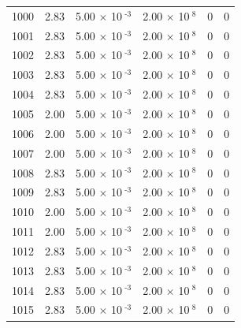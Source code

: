 \documentclass[a4paper,11pt]{article}
\begin{document}
\begin{center}
\begin{longtable}{|R{1.5cm}|R{2.4cm}|R{2.4cm}|R{2.4cm}|R{2.4cm}|R{2.4cm}|}
 1000 &   2.83  &         5.00 $\times$ 10$^{\text{          -3}}$  &         2.00 $\times$ 10$^{\text{           8}}$  & 0  & 0 \\
 1001 &   2.83  &         5.00 $\times$ 10$^{\text{          -3}}$  &         2.00 $\times$ 10$^{\text{           8}}$  & 0  & 0 \\
 1002 &   2.83  &         5.00 $\times$ 10$^{\text{          -3}}$  &         2.00 $\times$ 10$^{\text{           8}}$  & 0  & 0 \\
 1003 &   2.83  &         5.00 $\times$ 10$^{\text{          -3}}$  &         2.00 $\times$ 10$^{\text{           8}}$  & 0  & 0 \\
 1004 &   2.83  &         5.00 $\times$ 10$^{\text{          -3}}$  &         2.00 $\times$ 10$^{\text{           8}}$  & 0  & 0 \\
 1005 &   2.00  &         5.00 $\times$ 10$^{\text{          -3}}$  &         2.00 $\times$ 10$^{\text{           8}}$  & 0  & 0 \\
 1006 &   2.00  &         5.00 $\times$ 10$^{\text{          -3}}$  &         2.00 $\times$ 10$^{\text{           8}}$  & 0  & 0 \\
 1007 &   2.00  &         5.00 $\times$ 10$^{\text{          -3}}$  &         2.00 $\times$ 10$^{\text{           8}}$  & 0  & 0 \\
 1008 &   2.83  &         5.00 $\times$ 10$^{\text{          -3}}$  &         2.00 $\times$ 10$^{\text{           8}}$  & 0  & 0 \\
 1009 &   2.83  &         5.00 $\times$ 10$^{\text{          -3}}$  &         2.00 $\times$ 10$^{\text{           8}}$  & 0  & 0 \\
 1010 &   2.00  &         5.00 $\times$ 10$^{\text{          -3}}$  &         2.00 $\times$ 10$^{\text{           8}}$  & 0  & 0 \\
 1011 &   2.00  &         5.00 $\times$ 10$^{\text{          -3}}$  &         2.00 $\times$ 10$^{\text{           8}}$  & 0  & 0 \\
 1012 &   2.83  &         5.00 $\times$ 10$^{\text{          -3}}$  &         2.00 $\times$ 10$^{\text{           8}}$  & 0  & 0 \\
 1013 &   2.83  &         5.00 $\times$ 10$^{\text{          -3}}$  &         2.00 $\times$ 10$^{\text{           8}}$  & 0  & 0 \\
 1014 &   2.83  &         5.00 $\times$ 10$^{\text{          -3}}$  &         2.00 $\times$ 10$^{\text{           8}}$  & 0  & 0 \\
 1015 &   2.83  &         5.00 $\times$ 10$^{\text{          -3}}$  &         2.00 $\times$ 10$^{\text{           8}}$  & 0  & 0 \\

\end{longtable}
\end{center}
\end{document}
